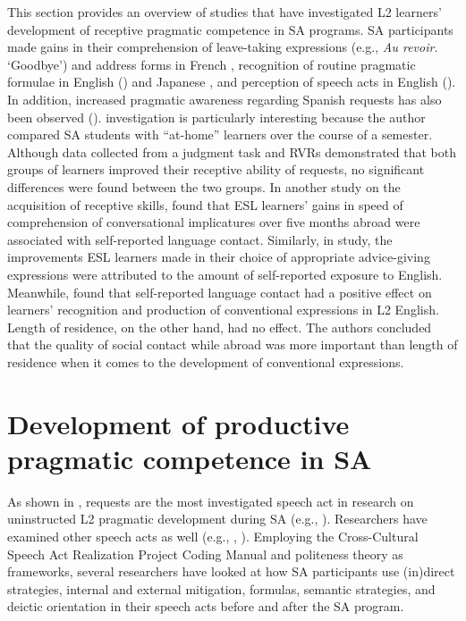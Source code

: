 \documentclass[output=paper]{langscibook}
\begin{document}
  This section provides an overview of studies that have investigated L2 learners’ development of receptive pragmatic competence in SA programs. SA participants made gains in their comprehension of leave-taking expressions (e.g., \textit{Au revoir.} ‘Goodbye’) and address forms in French \citep{Kinginger2008}, recognition of routine pragmatic formulae in English (\citealt{AlcónSolerSánchezHernández2017,Roever2012}) and Japanese \citep{Osuka2014}, and perception of speech acts in English (\citealt{VilarBeltrán2014,Schauer2006,Schauer2009}). In addition, increased pragmatic awareness regarding Spanish requests has also been observed (\citealt{CzerwionkaCuza2017a,Rodríguez2001}).  investigation is particularly interesting because the author compared SA students with “at-home” learners over the course of a semester. Although data collected from a judgment task and RVRs demonstrated that both groups of learners improved their receptive ability of requests, no significant differences were found between the two groups. In another study on the acquisition of receptive skills, \citet{Taguchi2008a,Taguchi2008b} found that ESL learners’ gains in speed of comprehension of conversational implicatures over five months abroad were associated with self-reported language contact. Similarly, in  study, the improvements ESL learners made in their choice of appropriate advice-giving expressions were attributed to the amount of self-reported exposure to English. Meanwhile, \citet{Bardovi-HarligBastos2011} found that self-reported language contact had a positive effect on learners’ recognition and production of conventional expressions in L2 English. Length of residence, on the other hand, had no effect. The authors concluded that the quality of social contact while abroad was more important than length of residence when it comes to the development of conventional expressions.

\section{Development of productive pragmatic competence in SA}

\begin{sloppypar}
  As shown in , requests are the most investigated speech act in research on uninstructed L2 pragmatic development during SA (e.g., \citealt{Bataller2010,Han2005,Hernández2016,ShivelyCohen2008}). Researchers have examined other speech acts as well (e.g., \citealt{Félix-Brasdefer2004,Félix-Brasdefer2013,Hernández2018a,Hoffman-Hicks1999,Schauer2006}, \citealt{Schauer2009}). Employing the Cross-Cultural Speech Act Realization Project Coding Manual \citep{Blum-KulkaKasper1989} and  politeness theory as frameworks, several researchers have looked at how SA participants use (in)direct strategies, internal and external mitigation, formulas, semantic strategies, and deictic orientation in their speech acts before and after the SA program.
\end{sloppypar}
\end{document}
